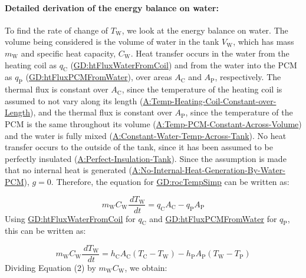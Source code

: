 \documentclass[12pt]{article}
\begin{document}
\paragraph{Detailed derivation of the energy balance on water:}
\label{IM:eBalanceOnWtrDeriv}
To find the rate of change of ${T_{\text{W}}}$, we look at the energy balance on water. The volume being considered is the volume of water in the tank ${V_{\text{W}}}$, which has mass ${m_{\text{W}}}$ and specific heat capacity, ${C_{\text{W}}}$. Heat transfer occurs in the water from the heating coil as ${q_{\text{C}}}$ (\hyperref[GD:htFluxWaterFromCoil]{GD:htFluxWaterFromCoil}) and from the water into the PCM as ${q_{\text{P}}}$ (\hyperref[GD:htFluxPCMFromWater]{GD:htFluxPCMFromWater}), over areas ${A_{\text{C}}}$ and ${A_{\text{P}}}$, respectively. The thermal flux is constant over ${A_{\text{C}}}$, since the temperature of the heating coil is assumed to not vary along its length (\hyperref[assumpTHCCoL]{A:Temp-Heating-Coil-Constant-over-Length}), and the thermal flux is constant over ${A_{\text{P}}}$, since the temperature of the PCM is the same throughout its volume (\hyperref[assumpTPCAV]{A:Temp-PCM-Constant-Across-Volume}) and the water is fully mixed (\hyperref[assumpCWTAT]{A:Constant-Water-Temp-Across-Tank}). No heat transfer occurs to the outside of the tank, since it has been assumed to be perfectly insulated (\hyperref[assumpPIT]{A:Perfect-Insulation-Tank}). Since the assumption is made that no internal heat is generated (\hyperref[assumpNIHGBWP]{A:No-Internal-Heat-Generation-By-Water-PCM}), $g=0$. Therefore, the equation for \hyperref[GD:rocTempSimp]{GD:rocTempSimp} can be written as:

\begin{displaymath}
{m_{\text{W}}} {C_{\text{W}}} \frac{\,d{T_{\text{W}}}}{\,dt}={q_{\text{C}}} {A_{\text{C}}}-{q_{\text{P}}} {A_{\text{P}}}
\end{displaymath}
Using \hyperref[GD:htFluxWaterFromCoil]{GD:htFluxWaterFromCoil} for ${q_{\text{C}}}$ and \hyperref[GD:htFluxPCMFromWater]{GD:htFluxPCMFromWater} for ${q_{\text{P}}}$, this can be written as:

\begin{displaymath}
{m_{\text{W}}} {C_{\text{W}}} \frac{\,d{T_{\text{W}}}}{\,dt}={h_{\text{C}}} {A_{\text{C}}} \left({T_{\text{C}}}-{T_{\text{W}}}\right)-{h_{\text{P}}} {A_{\text{P}}} \left({T_{\text{W}}}-{T_{\text{P}}}\right)
\end{displaymath}
Dividing Equation (2) by ${m_{\text{W}}} {C_{\text{W}}}$, we obtain:
\end{document}
